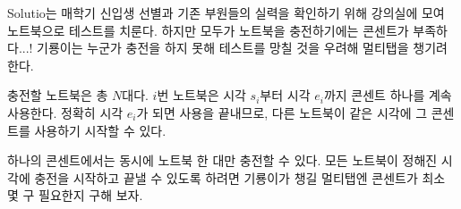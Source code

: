 Solutio는 매학기 신입생 선별과 기존 부원들의 실력을 확인하기 위해 강의실에 모여 노트북으로 테스트를 치룬다.
하지만 모두가 노트북을 충전하기에는 콘센트가 부족하다...! 
기룡이는 누군가 충전을 하지 못해 테스트를 망칠 것을 우려해 멀티탭을 챙기려 한다.

충전할 노트북은 총 $N$대다. 
$i$번 노트북은 시각 $s_i$부터 시각 $e_i$까지 콘센트 하나를 계속 사용한다. 
정확히 시각 $e_i$가 되면 사용을 끝내므로, 
다른 노트북이 같은 시각에 그 콘센트를 사용하기 시작할 수 있다.

하나의 콘센트에서는 동시에 노트북 한 대만 충전할 수 있다.
모든 노트북이 정해진 시각에 충전을 시작하고 끝낼 수 있도록 하려면 기룡이가 챙길 멀티탭엔 콘센트가 최소 몇 구 필요한지 구해 보자.